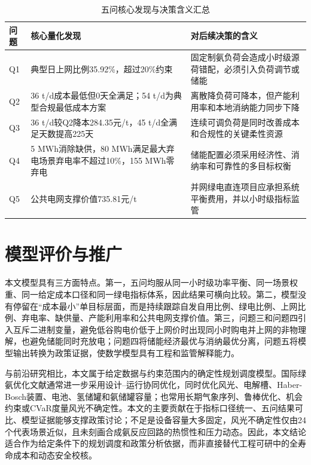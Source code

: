 \documentclass[UTF8,a4paper,12pt]{ctexart}
\begin{document}
\begin{table}[H]
\centering
\caption{五问核心发现与决策含义汇总}
\label{tab:overall_chain}
\small
\begin{tabular}{p{}p{}p{}}
\toprule
问题 & 核心量化发现 & 对后续决策的含义\\
\midrule
Q1 & 典型日上网比例35.92\%，超过20\%约束 & 固定制氨负荷会造成小时级源荷错配，必须引入负荷调节或储能\\
Q2 & 36 t/d成本最低但0天全满足；54 t/d为典型合规最低成本方案 & 离散降负荷可降本，但产能利用率和本地消纳能力同步下降\\
Q3 & 36 t/d较Q2降本284.35元/t，45 t/d全满足天数提高225天 & 连续可调负荷是同时改善成本和合规性的关键柔性资源\\
Q4 & 5 MWh消除缺供，80 MWh满足最大弃电场景弃电率不超过10\%，155 MWh零弃电 & 储能配置必须采用经济性、消纳率和可靠性的多目标权衡\\
Q5 & 公共电网支撑价值735.81元/t & 并网绿电直连项目应承担系统平衡费用，并以小时级指标监管\\
\bottomrule
\end{tabular}
\end{table}

\section{模型评价与推广}

本文模型具有三方面特点。第一，五问均服从同一小时级功率平衡、同一场景权重、同一给定成本口径和同一绿电指标体系，因此结果可横向比较。第二，模型没有停留在“成本最小”单目标层面，而是持续跟踪自发自用比例、绿电比例、上网比例、弃电率、缺供量、产能利用率和公共电网支撑价值。第三，问题三和问题四引入互斥二进制变量，避免低谷购电价低于上网价时出现同小时购电并上网的非物理解，也避免储能同时充放电；问题四将储能经济最优与消纳最优分离，问题五将模型输出转换为政策证据，使数学模型具有工程和监管解释能力。

与前沿研究相比，本文属于给定数据与约束范围内的确定性规划调度模型。国际绿氨优化文献通常进一步采用设计--运行协同优化，同时优化风光、电解槽、Haber-Bosch装置、电池、氢储罐和氨储罐容量；也常用长期气象序列、鲁棒优化、机会约束或CVaR度量风光不确定性\cite{irena_ammonia,iea_hydrogen,eu_rfnbo,nayak_green_ammonia,electric_haber_bosch,power_to_ammonia_scheduling,cn_eha_dispatch,cn_robust_hydrogen_ammonia}。本文的主要贡献在于指标口径统一、五问结果可比、模型证据能够支撑政策讨论；不足是设备容量大多固定，风光不确定性仅由24个代表场景近似，且未刻画合成氨反应回路的热惯性和压力动态。因此，本文结论适合作为给定条件下的规划调度和政策分析依据，而非直接替代工程可研中的全寿命成本和动态安全校核。
\end{document}
